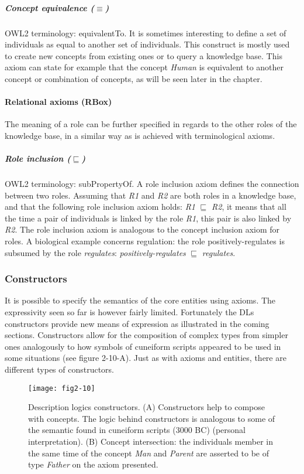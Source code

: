 \subparagraph{Concept equivalence ($ \equiv $)\\}
OWL2 terminology: equivalentTo. It is sometimes interesting to define a set of individuals as equal to another set of individuals. This construct is mostly used to create new concepts from existing ones or to query a knowledge base. This axiom can state for example that the concept \emph{Human} is equivalent to another concept or combination of concepts, as will be seen later in the chapter.

\paragraph{\textbf{Relational axioms (RBox)}\\}

The meaning of a role can be further specified in regards to the other roles of the knowledge base, in a similar way as is achieved with terminological axioms.

\subparagraph{Role inclusion ($ \sqsubseteq $)\\}
OWL2 terminology: subPropertyOf. A role inclusion axiom defines the connection between two roles. Assuming that \emph{R1} and \emph{R2} are both roles in a knowledge base, and that the following role inclusion axiom holds: \emph{R1} $ \sqsubseteq $ \emph{R2}, it means that all the time a pair of individuals is linked by the role \emph{R1}, this pair is also linked by \emph{R2}. The role inclusion axiom is analogous to the concept inclusion axiom for roles. A biological example concerns regulation: the role positively-regulates is subsumed by the role \emph{regulates}: \emph{positively-regulates} $ \sqsubseteq $ \emph{regulates}.

\subsubsection{Constructors}

It is possible to specify the semantics of the core entities using axioms. The expressivity seen so far is however fairly limited. Fortunately the DLs constructors provide new means of expression as illustrated in the coming sections. Constructors allow for the composition of complex types from simpler ones analogously to how symbols of cuneiform scripts appeared to be used in some situations (see figure 2-10-A). Just as with axioms and entities, there are different types of constructors.

\begin{figure}[ht]
    \centering
    \texttt{[image: fig2-10]}
    \caption{Description logics constructors. (A) Constructors help to compose with concepts. The logic behind constructors is analogous to some of the semantic found in cuneiform scripts (3000 BC) (personal interpretation). (B) Concept intersection: the individuals member in the same time of the concept \emph{Man} and \emph{Parent} are asserted to be of type \emph{Father} on the axiom presented.}
    \label{fig2-10}
\end{figure}

